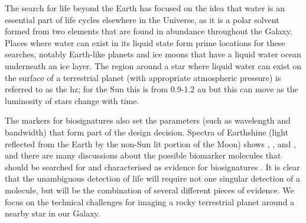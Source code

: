 \documentclass[letterpaper]{ar-1col}
\begin{document}




The search for life beyond the Earth has focused on the idea that water is an essential part of life cycles elsewhere in the Universe, as it is a polar solvent formed from two elements that are found in abundance throughout the Galaxy.
%
Places where water can exist in its liquid state form prime locations for these searches, notably Earth-like planets and ice moons that have a liquid water ocean underneath an ice layer.
%
The region around a star where liquid water can exist on the surface of a terrestrial planet (with appropriate atmospheric pressure) is referred to as the \ac{hz}; for the Sun this is from 0.9-1.2 au but this can move as the luminosity of stars change with time.

The markers for biosignatures also set the parameters (such as wavelength and bandwidth) that form part of the design decision.
%
Spectra of Earthshine (light reflected from the Earth by the non-Sun lit portion of the Moon) shows , ,  and  \citep{Turnbull06}, and there are many discussions about the possible biomarker molecules that should be searched for and characterised as evidence for biosignatures \citep[see the reviews of ][]{2016AsBio..16..465S,2017ARAA..55..433K,2018AsBio..18..663S}.
%
%
It is clear that the unambiguous detection of life will require not one singular detection of a molecule, but will be the combination of several different pieces of evidence.
%
We focus on the technical challenges for imaging a rocky terrestrial planet around a nearby star in our Galaxy.



\end{document}
